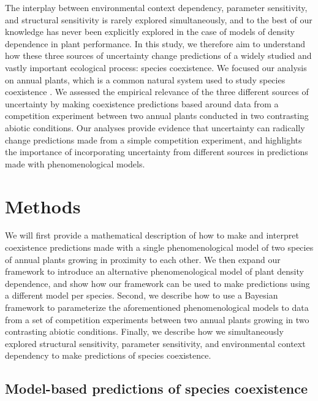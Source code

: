 \begin{refsection}
The interplay between environmental context dependency, parameter sensitivity, and structural sensitivity is rarely explored simultaneously, and to the best of our knowledge  has never been explicitly explored in the case of models of density dependence in plant performance. In this study, we therefore aim to understand how these three sources of uncertainty change predictions of a widely studied and vastly important ecological process: species coexistence. We focused our analysis on annual plants, which is a common natural system used to study species coexistence \citep{mayfield2017higher, godoy_phenology_2014,levine2009importance, zepeda2019fluctuation}. We assessed the empirical relevance of the three different sources of uncertainty by making coexistence predictions based around data from a competition experiment between two annual plants conducted in two contrasting abiotic conditions. Our analyses provide evidence that uncertainty can radically change predictions made from a simple competition experiment, and highlights the importance of incorporating uncertainty from different sources in predictions made with phenomenological models.

\section*{Methods}

We will first provide a mathematical description of how to make and interpret coexistence predictions made with a single phenomenological model of two species of annual plants growing in proximity to each other. We then expand our framework to introduce an alternative phenomenological model of plant density dependence, and show how our framework can be used to make predictions using a different model per species. Second, we describe how to use a Bayesian framework to parameterize the  aforementioned  phenomenological models  to data from a set of competition experiments between two annual plants growing in two contrasting abiotic conditions. Finally, we describe how we simultaneously explored structural sensitivity, parameter sensitivity, and environmental context dependency to make predictions of species coexistence.


\subsection*{Model-based predictions of species coexistence }


\end{refsection}
